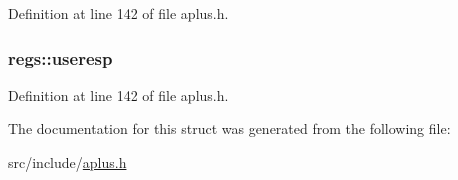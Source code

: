 Definition at line 142 of file aplus.\+h.

\hypertarget{structregs_af7e777e1535d887de07a5bf3d11eb15f}{
\subsubsection[{useresp}]{ regs\+::useresp}}\label{structregs_af7e777e1535d887de07a5bf3d11eb15f}


Definition at line 142 of file aplus.\+h.



The documentation for this struct was generated from the following file\+:\begin{DoxyCompactItemize}
\item 
src/include/\hyperlink{aplus_8h}{aplus.\+h}\end{DoxyCompactItemize}
